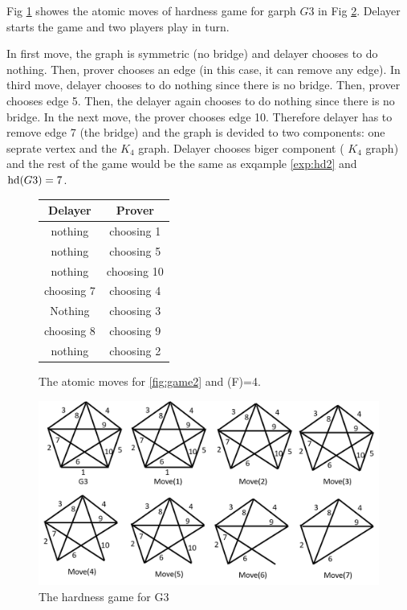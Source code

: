 \documentclass[12pt]{book}
\begin{document}
\begin{examp}\label{exp:hd3}
       Fig \ref{fig:game3} showes the atomic moves of hardness game for garph $G3$ in Fig \ref{fig:hd3}. Delayer starts the game and two 
	   players play in turn. 
	   
	   In first move, the graph is symmetric (no bridge) and delayer chooses to do nothing. Then, prover chooses an edge (in this case, it can remove any edge). 
	   In third move, delayer chooses to do nothing since there is no bridge. Then, prover chooses edge 5. Then, the delayer again chooses to do nothing since 
	   there is no bridge. In the next move, the prover chooses edge 10. Therefore delayer has to remove edge 7 (the bridge) and the graph is devided to two components: 
	   one seprate vertex and the $K_4$ graph. 
	   Delayer chooses biger component ( $K_4$ graph) and the rest of the game would be the same as exqample \ref{exp:hd2} and $\operatorname{hd}(G3)=7$.
	 
	   \begin{figure}[h]
      \centering
      \begin{tabular}{|c|c|} 
      \hline
                  Delayer & Prover \\ \hline
                  nothing & choosing 1  \\ \hline
				  nothing & choosing 5  \\ \hline
				  nothing & choosing 10  \\ \hline
                  choosing 7 & choosing 4  \\ \hline
				  Nothing & choosing 3  \\ \hline
                  choosing 8 & choosing 9  \\ \hline
				  nothing & choosing 2  \\ \hline
      \end{tabular}
      \caption{The atomic moves for \ref{fig:game2} and \hardness(F)=4.}
      \label{fig:game3}
      \end{figure}
	  \begin{figure}
      \begin{center}
      \includegraphics[scale =0.6]{g3.png}
      \caption{The hardness game for G3}
	  \label{fig:hd3}
      \end{center}
      \end{figure}
\end{examp}
\end{document}

